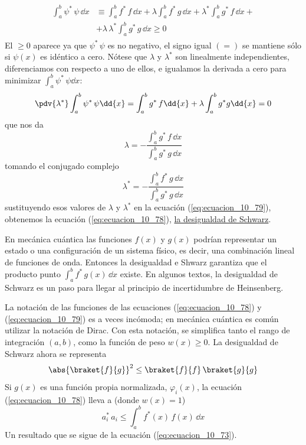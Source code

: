 \begin{align}
\begin{aligned}
\int_{a}^{b} \psi^{*} \, \psi \, \dd{x} &\equiv \int_{a}^{b} f^{*} \, f \, \dd{x} + \lambda \int_{a}^{b} f^{*} \, g \, \dd{x} + \lambda^{*} \int_{a}^{b} g^{*} \, f \, \dd{x} + \\
&+ \lambda \, \lambda^{*} \int_{a}^{b} g^{*} \, g \, \dd{x}  \geq 0
\end{aligned}
\label{eq:ecuacion_10_79}
\end{align}
El $\geq 0$ aparece ya que $\psi^{*} \, \psi$ es no negativo, el signo igual $(=)$ se mantiene sólo si $\psi (x)$ es idéntico a cero. Nótese que $\lambda$ y $\lambda^{*}$ son linealmente independientes, diferenciamos con respecto a uno de ellos, e igualamos la derivada a cero para minimizar $\displaystyle \int_{a}^{b} \psi^{*} \, \psi \dd{x}$:
\begin{align*}
\pdv{\lambda^{*}} \int_{a}^{b} \psi^{*} \, \psi \dd{x} = \int_{a}^{b} g^{*} \, f \dd{x}  + \lambda \int_{a}^{b} g^{*} g \dd{x} = 0
\end{align*}
que nos da
\begin{equation}
\lambda = - \dfrac{\displaystyle \int_{a}^{b} g^{*} \, f \, \dd{x}}{\displaystyle \int_{a}^{b} g^{*} \, g \, \dd{x}}
\label{eq:ecuacion_10_80a}
\end{equation}
tomando el conjugado complejo 
\begin{equation}
\lambda^{*} = - \dfrac{\displaystyle \int_{a}^{b} f^{*} \, g \, \dd{x}}{\displaystyle \int_{a}^{b} g^{*} \, g \, \dd{x}}
\label{eq:ecuacion_80b}
\end{equation}
sustituyendo esos valores de $\lambda$ y $\lambda^{*}$ en la ecuación (\ref{eq:ecuacion_10_79}), obtenemos la ecuación (\ref{eq:ecuacion_10_78}), \underline{la desigualdad de Schwarz}.
\par
En mecánica cuántica las funciones $f(x)$ y $g(x)$ podrían representar un estado o una configuración de un sistema físico, es decir, una combinación lineal de funciones de onda. Entonces la desigualdad e Shwarz garantiza que el producto punto $\displaystyle \int_{a}^{b} f^{*} \, g(x) \, \dd{x}$ existe. En algunos textos, la desigualdad de Schwarz es un paso para llegar al principio de incertidumbre de Heinsenberg.
\par
La notación de las funciones de las ecuaciones (\ref{eq:ecuacion_10_78}) y (\ref{eq:ecuacion_10_79}) es a veces incómoda; en mecánica cuántica es común utilizar la notación de Dirac. Con esta notación, se simplifica tanto el rango de integración $(a, b)$, como la función de peso $w(x) \geq 0$. La desigualdad de Schwarz ahora se representa
\begin{equation}
\abs{\braket{f}{g}}^{2} \leq \braket{f}{f} \, \braket{g}{g}
\label{eq:ecuacion_10_78a}
\end{equation}
Si $g(x)$ es una función propia normalizada, $\varphi_{i}(x)$, la ecuación (\ref{eq:ecuacion_10_78}) lleva a (donde $w(x)=1$)
\begin{equation}
a_{i}^{*} \, a_{i} \leq \int_{a}^{b} f^{*}(x) \, f(x) \, \dd{x} 
\label{eq:ecuacion_10_81}
\end{equation}
Un resultado que se sigue de la ecuación (\ref{eq:ecuacion_10_73}).

